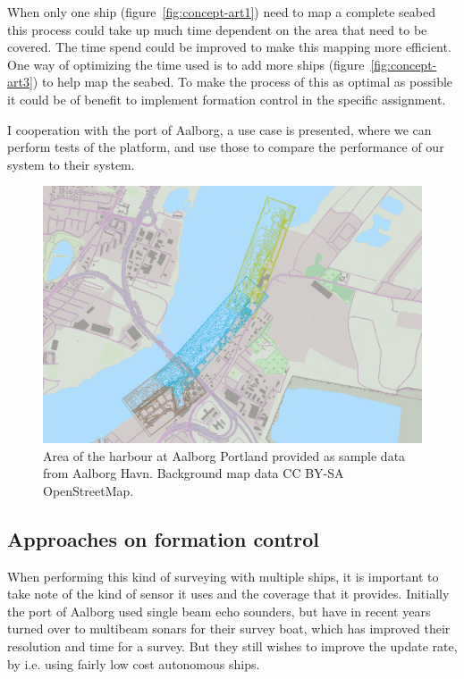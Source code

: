 When only one ship (figure~\vref{fig:concept-art1}) need to map a complete seabed this process could
take up much time dependent on the area that need to be covered. The
time spend could be improved to make this mapping more efficient. One
way of optimizing the time used is to add more ships (figure~\vref{fig:concept-art3}) to help map the
seabed. To make the process of this as optimal as possible it could be
of benefit to implement formation control in the specific assignment.

I cooperation with the port of Aalborg, a use case is presented, where we can perform tests of the platform, and use those to compare the performance of our system to their system.
\begin{figure}[htbp]
	\centering
	\includegraphics[width=\textwidth]{fig/use-case-data}
	\caption{Area of the harbour at Aalborg Portland provided as sample
	data from Aalborg Havn. Background map data CC BY-SA OpenStreetMap.}
	\label{fig:diffforms}
\end{figure}


\subsection{Approaches on formation control}
When performing this kind of surveying with multiple ships, it is important to take note of the kind of sensor it uses and the coverage that it provides. Initially the port of Aalborg used single beam echo sounders, but have in recent years turned over to multibeam sonars for their survey boat, which has improved their resolution and time for a survey. But they still wishes to improve the update rate, by i.e. using fairly low cost autonomous ships.

